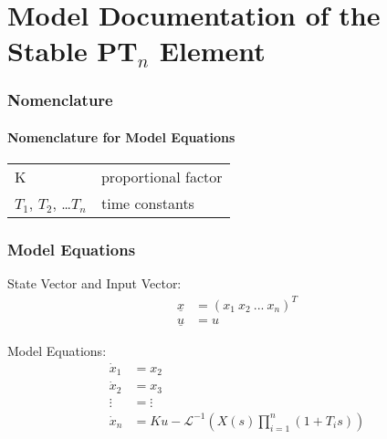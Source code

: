 \documentclass[10pt,a4paper]{article}
\begin{document}
	\part*{Model Documentation of the \\ Stable PT$_n$ Element} %
	
	
	
	
	\section{Nomenclature} %
	\subsection{Nomenclature for Model Equations} %
	
	\begin{tabular}{ll}
		K & proportional factor \\
		$T_1$, $T_2$, \dots $T_n$ & time constants
	\end{tabular}
	
	
	
	\section{Model Equations} %
	
	State Vector and Input Vector:
	\begin{align*}
		\underline{x} &= (x_1 \ x_2 \ ... \ x_n)^T \\
		\underline{u} &= u
	\end{align*}

	\noindent Model Equations:		
	\begin{subequations}
	\begin{align}
		\dot{x}_1 &= x_2 \\    
		\dot{x}_2 &= x_3 \\
		\vdots &= \vdots \\
		\dot{x}_n &= Ku - \mathscr{L}^{-1}(X(s) \prod_{i = 1}^{n}(1 + T_i s))
	\end{align}
	\end{subequations}
\end{document}
